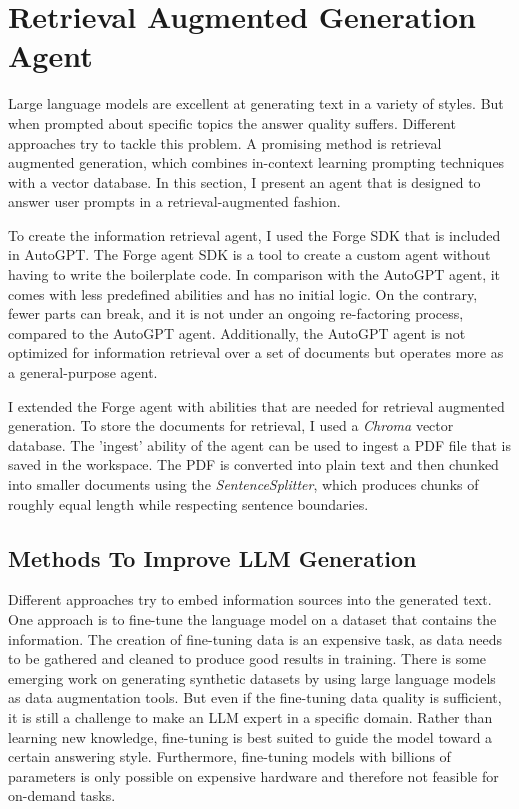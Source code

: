 \documentclass[../main.tex]{subfiles}
\begin{document}
\chapter{Retrieval Augmented Generation Agent}
\label{ch:agent}

Large language models are excellent at generating text in a variety of styles.
But when prompted about specific topics the answer quality suffers.
Different approaches try to tackle this problem.
A promising method is retrieval augmented generation, which combines in-context learning prompting techniques with a vector database.
In this section, I present an agent that is designed to answer user prompts in a retrieval-augmented fashion.

To create the information retrieval agent,
I used the Forge SDK \autocite{zotero-117} that is included in AutoGPT.
The Forge agent SDK is a tool to create a custom agent without having to write the boilerplate code.
In comparison with the AutoGPT agent, it comes with less predefined abilities and has no initial logic.
On the contrary, fewer parts can break, and it is not under an ongoing re-factoring process,
compared to the AutoGPT agent.
Additionally, the AutoGPT agent is not optimized for information retrieval over a set of documents
but operates more as a general-purpose agent.

I extended the Forge agent with abilities that are needed for retrieval augmented generation.
To store the documents for retrieval, I used a \emph{Chroma} vector database.
The 'ingest' ability of the agent can be used to ingest a PDF file that is saved in the workspace.
The PDF is converted into plain text and then chunked into smaller documents using the \emph{SentenceSplitter},
which produces chunks of roughly equal length while respecting sentence boundaries.

\section{Methods To Improve LLM Generation}

Different approaches try to embed information sources into the generated text.
One approach is to fine-tune the language model on a dataset that contains the information.
The creation of fine-tuning data is an expensive task, as data needs to be gathered and cleaned to produce good results in training.
There is some emerging work on generating synthetic datasets by using large language models as data augmentation tools.
But even if the fine-tuning data quality is sufficient, it is still a challenge to make an LLM expert in a specific domain.
Rather than learning new knowledge, fine-tuning is best suited to guide the model toward a certain answering style.
Furthermore, fine-tuning models with billions of parameters is only possible on expensive hardware and therefore not feasible for on-demand tasks.
\end{document}
